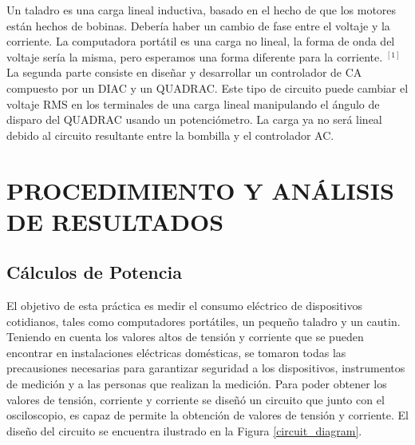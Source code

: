 \documentclass[journal]{IEEEtran}
\begin{document}
Un taladro es una carga lineal inductiva, basado 
en el hecho de que los motores están hechos de 
bobinas. Debería haber un cambio de fase entre el 
voltaje y la corriente. La computadora portátil 
es una carga no lineal, la forma de onda del voltaje 
sería la misma, pero esperamos una forma diferente 
para la corriente. $^{\left[1\right]}$ \\

La segunda parte consiste en diseñar y desarrollar 
un controlador de CA compuesto por un DIAC y un 
QUADRAC. Este tipo de circuito puede cambiar el 
voltaje RMS en los terminales de una carga lineal 
manipulando el ángulo de disparo del QUADRAC usando 
un potenciómetro. La carga ya no será lineal debido 
al circuito resultante entre la bombilla y el 
controlador AC.



\section{PROCEDIMIENTO Y ANÁLISIS DE RESULTADOS}

\subsection{Cálculos de Potencia}

El objetivo de esta práctica es medir el consumo eléctrico 
de dispositivos cotidianos, tales como computadores 
portátiles, un pequeño taladro y un cautin. Teniendo en 
cuenta los valores altos de tensión y corriente que se 
pueden encontrar en instalaciones eléctricas domésticas, se
tomaron todas las precausiones necesarias para garantizar 
seguridad a los dispositivos, instrumentos de medición y 
a las personas que realizan la medición. Para poder 
obtener los valores de tensión, corriente y corriente se 
diseñó un circuito que junto con el osciloscopio, es capaz de
permite la obtención de valores de tensión y corriente. El 
diseño del circuito se encuentra ilustrado en la Figura 
\ref{circuit_diagram}. \\

\end{document}
